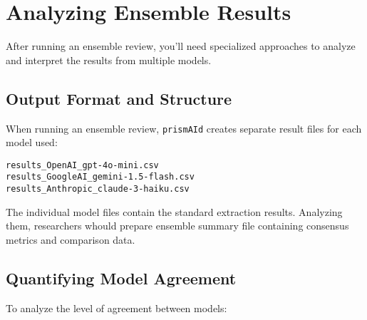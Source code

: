\section{Analyzing Ensemble Results}

After running an ensemble review, you'll need specialized approaches to analyze and interpret the results from multiple models.

\subsection{Output Format and Structure}

When running an ensemble review, \texttt{prismAId} creates separate result files for each model used:

\begin{commandbox}
\begin{lstlisting}
results_OpenAI_gpt-4o-mini.csv
results_GoogleAI_gemini-1.5-flash.csv
results_Anthropic_claude-3-haiku.csv
\end{lstlisting}
\end{commandbox}

The individual model files contain the standard extraction results. Analyzing them, researchers whould prepare ensemble summary file containing consensus metrics and comparison data.

\subsection{Quantifying Model Agreement}

To analyze the level of agreement between models:

